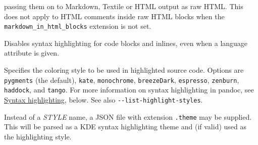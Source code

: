 \documentclass[
]{article}
\begin{document}
\begin{description}
passing them on to Markdown, Textile or HTML output as raw HTML. This
does not apply to HTML comments inside raw HTML blocks when the
\texttt{markdown\_in\_html\_blocks} extension is not set.
\item[\texttt{-\/-no-highlight}]
Disables syntax highlighting for code blocks and inlines, even when a
language attribute is given.
\item[\texttt{-\/-highlight-style=}\emph{STYLE}\textbar{}\emph{FILE}]
Specifies the coloring style to be used in highlighted source code.
Options are \texttt{pygments} (the default), \texttt{kate},
\texttt{monochrome}, \texttt{breezeDark}, \texttt{espresso},
\texttt{zenburn}, \texttt{haddock}, and \texttt{tango}. For more
information on syntax highlighting in pandoc, see
\protect\hyperlink{syntax-highlighting}{Syntax highlighting}, below. See
also \texttt{-\/-list-highlight-styles}.

Instead of a \emph{STYLE} name, a JSON file with extension
\texttt{.theme} may be supplied. This will be parsed as a KDE syntax
highlighting theme and (if valid) used as the highlighting style.


\end{description}
\end{document}
